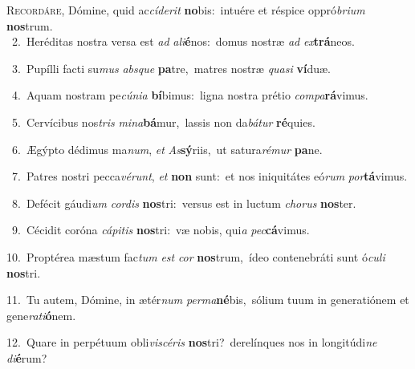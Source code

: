 \lettrine{\initial\textcolor{\initialcolor}{R}}{ecordáre,} Dómine, quid ac\-\textit{cí}\-\textit{de}\textit{rit} \textbf{no}\-bis:~\star intuére et réspice oppró\-\textit{bri}\-\textit{um} \textbf{nos}\-trum.\\
{\numbfont\textcolor{\numbcolor}{~2.}}~Heréditas nostra versa est \textit{ad} \textit{a}\-\textit{li}\textbf{é}nos:~\star domus nostræ \textit{ad} \textit{ex}\-\textbf{trá}neos.\par
{\numbfont\textcolor{\numbcolor}{~3.}}~Pupílli facti su\textit{mus} \textit{abs}\-\textit{que} \textbf{pa}\-tre,~\star matres nostræ \textit{qua}\-\textit{si} \textbf{ví}\-duæ.\par
{\numbfont\textcolor{\numbcolor}{~4.}}~Aquam nostram pe\-\textit{cú}\-\textit{ni}\textit{a} \textbf{bí}\-bimus:~\star ligna nostra prétio \textit{com}\-\textit{pa}\textbf{rá}vimus.\par
{\numbfont\textcolor{\numbcolor}{~5.}}~Cervícibus nos\textit{tris} \textit{mi}\-\textit{na}\textbf{bá}mur,~\star lassis non da\-\textit{bá}\-\textit{tur} \textbf{ré}\-quies.\par
{\numbfont\textcolor{\numbcolor}{~6.}}~Ægýpto dédimus ma\-\textit{num}\-, \textit{et} \textit{As}\-\textbf{sý}riis,~\star ut satura\-\textit{ré}\-\textit{mur} \textbf{pa}\-ne.\par
{\numbfont\textcolor{\numbcolor}{~7.}}~Patres nostri pecca\-\textit{vé}\-\textit{runt}, \textit{et} \textbf{non} sunt:~\star et nos iniquitátes eó\textit{rum} \textit{por}\-\textbf{tá}vimus.\par
{\numbfont\textcolor{\numbcolor}{~8.}}~Defécit gáudi\textit{um} \textit{cor}\-\textit{dis} \textbf{nos}\-tri:~\star versus est in luctum \textit{cho}\-\textit{rus} \textbf{nos}\-ter.\par
{\numbfont\textcolor{\numbcolor}{~9.}}~Cécidit coróna \textit{cá}\-\textit{pi}\textit{tis} \textbf{nos}\-tri:~\star væ nobis, qui\textit{a} \textit{pec}\-\textbf{cá}vimus.\par
{\numbfont\textcolor{\numbcolor}{10.}}~Proptérea mæstum fac\textit{tum} \textit{est} \textit{cor} \textbf{nos}\-trum,~\star ídeo contenebráti sunt ó\-\textit{cu}\-\textit{li} \textbf{nos}\-tri.\par
{\numbfont\textcolor{\numbcolor}{11.}}~Tu autem, Dómine, in ætér\textit{num} \textit{per}\-\textit{ma}\textbf{né}bis,~\star sólium tuum in generatiónem et gene\-\textit{ra}\-\textit{ti}\textbf{ó}nem.\par
{\numbfont\textcolor{\numbcolor}{12.}}~Quare in perpétuum obli\-\textit{vi}\-\textit{scé}\textit{ris} \textbf{nos}\-tri?~\star derelínques nos in longitúdi\textit{ne} \textit{di}\-\textbf{é}rum?\par
